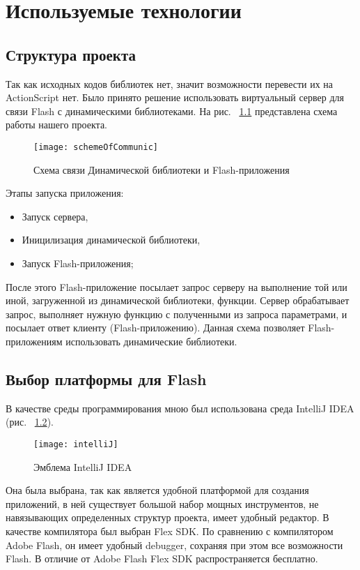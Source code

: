 \chapter{Используемые технологии}
\section{Структура проекта}
Так как исходных кодов библиотек нет, значит возможности перевести их на ActionScript нет. Было принято решение использовать виртуальный сервер для связи Flash с динамическими библиотеками. На рис. ~\ref{scheme1} представлена схема работы нашего проекта.\\
\begin{figure}[!ht]
	\begin{center}
		\texttt{[image: schemeOfCommunic]}
	\end{center}
	\caption{Схема связи Динамической библиотеки и Flash-приложения}
	\label{scheme1}
\end{figure}

Этапы запуска приложения:
 \begin{itemize}
        \item Запуск сервера,
        \item Иницилизация динамической библиотеки,
        \item Запуск Flash-приложения;
    \end{itemize}

После этого Flash-приложение посылает запрос серверу на выполнение той или иной, загруженной из динамической библиотеки, функции. Сервер обрабатывает запрос, выполняет нужную функцию с полученными из запроса параметрами, и посылает ответ клиенту (Flash-приложению). 
Данная схема позволяет Flash-приложениям использовать динамические библиотеки.

\section{Выбор платформы для Flash}
В качестве среды программирования мною был использована среда IntelliJ IDEA (рис. ~\ref{inteliJ}).
\begin{figure}[!ht]
	\begin{center}
		\texttt{[image: intelliJ]}
	\end{center}
	\caption{Эмблема IntelliJ IDEA}
	\label{inteliJ}
\end{figure}
Она была выбрана, так как является удобной платформой для создания приложений, в ней существует большой набор мощных инструментов, не навязывающих определенных структур проекта, имеет удобный редактор. В качестве компилятора был выбран Flex SDK. По сравнению с компилятором Adobe Flash, он имеет удобный debugger, сохраняя при этом все возможности Flash. В отличие от Adobe Flash Flex SDK распространяется бесплатно.

